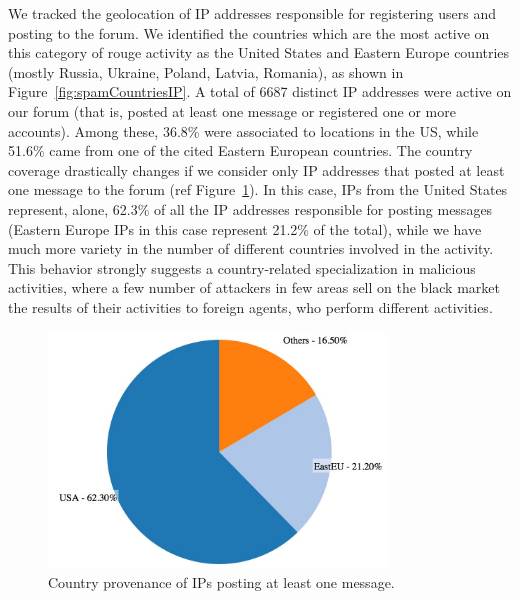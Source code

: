 We tracked the geolocation of IP addresses responsible for registering users and posting to the forum. We identified the countries which are the most active on this category of rouge activity as the United States and Eastern Europe countries (mostly Russia, Ukraine, Poland, Latvia, Romania), as shown in Figure~\ref{fig:spamCountriesIP}. A total of 6687 distinct IP addresses were active on our forum (that is, posted at least one message or registered one or more accounts). Among these, 36.8\% were associated to locations in the US, while 51.6\% came from one of the cited Eastern European countries. The country coverage drastically changes if we consider only IP addresses that posted at least one message to the forum (ref Figure~\ref{fig:spamCountriesMessage}). In this case, IPs from the United States represent, alone, 62.3\% of all the IP addresses responsible for posting messages (Eastern Europe IPs in this case represent 21.2\% of the total), while we have much more variety in the number of different countries involved in the activity. This behavior strongly suggests a country-related specialization in malicious activities, where a few number of attackers in few areas sell on the black market the results of their activities to foreign agents, who perform different activities.

\begin{figure}[tbh]
\centerline{\includegraphics[width=0.8\textwidth]{Images/spamCountriesMessage.jpg}}
\caption{Country provenance of IPs posting at least one message.\label{fig:spamCountriesMessage}}
\end{figure}

